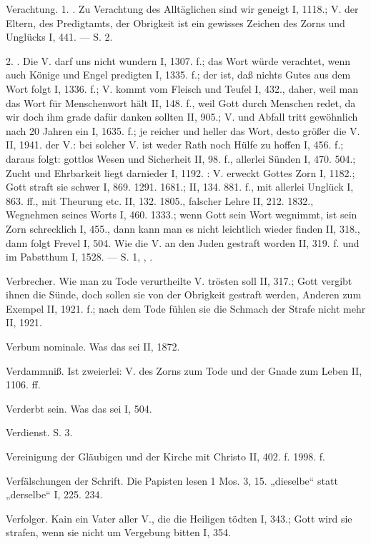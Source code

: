 Verachtung. 1. . Zu Verachtung des Alltäglichen sind wir geneigt I, 1118.; V. der Eltern, des Predigtamts, der Obrigkeit ist ein gewisses Zeichen des Zorns und Unglücks I, 441. — S.  2.

2. . Die V.  darf uns nicht wundern I, 1307. f.; das Wort würde verachtet, wenn auch Könige und Engel predigten I, 1335. f.; der  ist, daß nichts Gutes aus dem Wort folgt I, 1336. f.; V. kommt vom Fleisch und Teufel I, 432., daher, weil man das Wort für Menschenwort hält II, 148. f., weil Gott durch Menschen redet, da wir doch ihm grade dafür danken sollten II, 905.; V. und Abfall tritt gewöhnlich nach 20 Jahren ein I, 1635. f.; je reicher und heller das Wort, desto größer die V. II, 1941.  der V.: bei solcher V. ist weder Rath noch Hülfe zu hoffen I, 456. f.; daraus folgt: gottlos Wesen und Sicherheit II, 98. f., allerlei Sünden I, 470. 504.; Zucht und Ehrbarkeit liegt darnieder I, 1192. : V. erweckt Gottes Zorn I, 1182.; Gott straft sie schwer I, 869. 1291. 1681.; II, 134. 881. f., mit allerlei Unglück I, 863. ff., mit Theurung etc. II, 132. 1805., falscher Lehre II, 212. 1832., Wegnehmen seines Worts I, 460. 1333.; wenn Gott sein Wort wegnimmt, ist sein Zorn schrecklich I, 455., dann kann man es nicht leichtlich wieder finden II, 318., dann folgt Frevel I, 504. Wie die V. an den Juden gestraft worden II, 319. f. und im Pabstthum I, 1528. — S.  1, , .

Verbrecher. Wie man zu Tode verurtheilte V. trösten soll II, 317.; Gott vergibt ihnen die Sünde, doch sollen sie von der Obrigkeit gestraft werden, Anderen zum Exempel II, 1921. f.; nach dem Tode fühlen sie die Schmach der Strafe nicht mehr II, 1921.

Verbum nominale. Was das sei II, 1872.

Verdammniß. Ist zweierlei: V. des Zorns zum Tode und der Gnade zum Leben II, 1106. ff.

Verderbt sein. Was das sei I, 504.

Verdienst. S.  3.

Vereinigung der Gläubigen und der Kirche mit Christo II, 402. f. 1998. f.

Verfälschungen der Schrift. Die Papisten lesen 1 Mos. 3, 15. „dieselbe“ statt „derselbe“ I, 225. 234.

Verfolger. Kain ein Vater aller V., die die Heiligen tödten I, 343.; Gott wird sie strafen, wenn sie nicht um Vergebung bitten I, 354.

